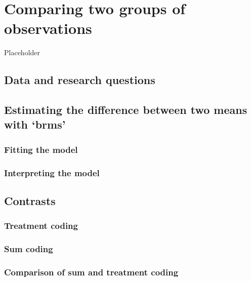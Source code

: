 \documentclass[
]{book}
\begin{document}
\hypertarget{comparing-two-groups-of-observations}{%
\chapter{Comparing two groups of observations}\label{comparing-two-groups-of-observations}}

Placeholder

\hypertarget{data-and-research-questions-2}{%
\section{Data and research questions}\label{data-and-research-questions-2}}

\hypertarget{estimating-the-difference-between-two-means-with-brms}{%
\section{Estimating the difference between two means with `brms'}\label{estimating-the-difference-between-two-means-with-brms}}

\hypertarget{fitting-the-model-1}{%
\subsection{Fitting the model}\label{fitting-the-model-1}}

\hypertarget{interpreting-the-model}{%
\subsection{Interpreting the model}\label{interpreting-the-model}}

\hypertarget{contrasts}{%
\section{Contrasts}\label{contrasts}}

\hypertarget{treatment-coding}{%
\subsection{Treatment coding}\label{treatment-coding}}

\hypertarget{sum-coding}{%
\subsection{Sum coding}\label{sum-coding}}

\hypertarget{comparison-of-sum-and-treatment-coding}{%
\subsection{Comparison of sum and treatment coding}\label{comparison-of-sum-and-treatment-coding}}
\end{document}

